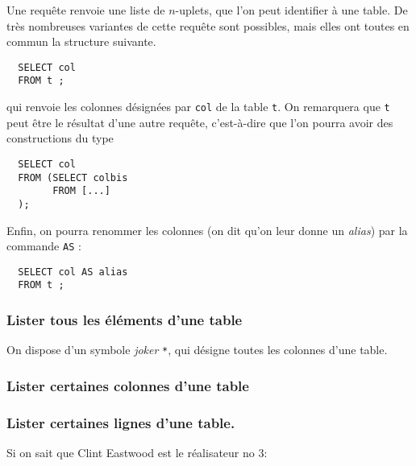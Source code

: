 Une requête renvoie une liste de $n$-uplets, que l'on peut identifier à une table.  De très nombreuses variantes de cette requête sont possibles, mais elles ont toutes en commun la structure suivante. 
\begin{lstlisting}
  SELECT col 
  FROM t ;
\end{lstlisting}
qui renvoie les colonnes désignées par \texttt{col} de la table \texttt{t}. On remarquera que \texttt{t} peut être le résultat d'une  autre requête, c'est-à-dire que l'on pourra avoir des constructions du type
\begin{lstlisting}
  SELECT col 
  FROM (SELECT colbis 
        FROM [...]
  );
\end{lstlisting}
Enfin, on pourra renommer les colonnes (on dit qu'on leur donne un \emph{alias}) par la commande \texttt{AS} : 
\begin{lstlisting}
  SELECT col AS alias 
  FROM t ;
\end{lstlisting}


\subsubsection{Lister tous les éléments d'une table}
On dispose d'un symbole \emph{joker} \texttt{*}, qui désigne toutes les colonnes d'une table. 

\begin{center}
\end{center}
\subsubsection{Lister certaines colonnes d'une table}


\begin{center}
\end{center}

\subsubsection{Lister certaines lignes d'une table.}
Si on sait que Clint Eastwood est le réalisateur no 3:

\begin{center}
\end{center}

